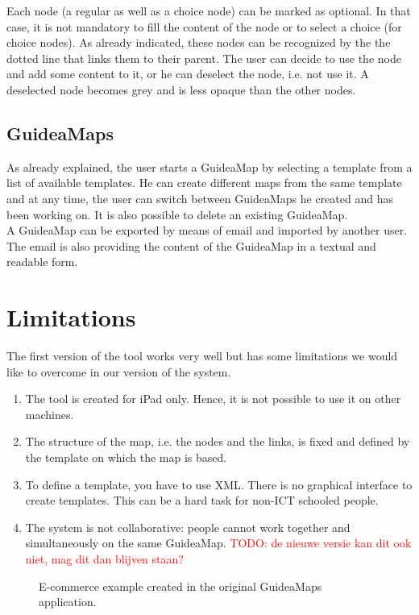 Each node (a regular as well as a choice node) can be marked as optional. In that case, it is not mandatory to fill the content of the node or to select a choice (for choice nodes). As already indicated, these nodes can be recognized by the the dotted line that links them to their parent. The user can decide to use the node and add some content to it, or he can deselect the node, i.e. not use it. A deselected node becomes grey and is less opaque than the other nodes.

\subsection{GuideaMaps}
As already explained, the user starts a GuideaMap by selecting a template from a list of available templates. He can create different maps from the same template and at any time, the user can switch between GuideaMaps he created and has been working on. It is also possible to delete an existing GuideaMap.\\

A GuideaMap can be exported by means of email and imported by another user. The email is also providing the content of the GuideaMap in a textual and readable form.

\section{Limitations}\label{sec:guidamaps-limitations}
The first version of the tool works very well but has some limitations we would like to overcome in our version of the system.
\begin{enumerate}
	\item The tool is created for iPad only. Hence, it is not possible to use it on other machines.
	\item The structure of the map, i.e. the nodes and the links, is fixed and defined by the template on which the map is based.
	\item To define a template, you have to use XML. There is no graphical interface to create templates. This can be a hard task for non-ICT schooled people.
	\item The system is not collaborative: people cannot work together and simultaneously on the same GuideaMap. \textcolor{red}{TODO: de nieuwe versie kan dit ook niet, mag dit dan blijven staan?}
\end{enumerate}

\begin{figure}[H]
	\centering
	\caption{E-commerce example created in the original GuideaMaps application.}
	\label{fig:gm1.0-ecommerce}
\end{figure}

